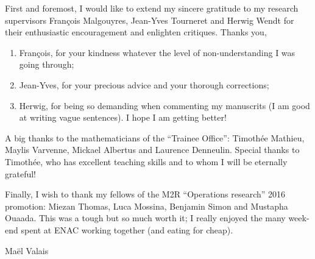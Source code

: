 \begin{foreword}[Acknowledgements]
First and foremost, I would like to extend my sincere gratitude to my research supervisors François Malgouyres, Jean-Yves Tourneret and Herwig Wendt for their enthusiastic encouragement and enlighten critiques. Thanks you,
\begin{enumerate}[label=--,noitemsep,nolistsep]
	\item François, for your kindness whatever the level of non-understanding I was going through;
	\item Jean-Yves, for your precious advice and your thorough corrections;
	\item Herwig, for being so demanding when commenting my manuscrits (I am good at writing vague sentences). I hope I am getting better!
\end{enumerate}

A big thanks to the mathematicians of the “Trainee Office”: Timothée Mathieu, Maylis Varvenne, Mickael Albertus and Laurence Denneulin. Special thanks to Timothée, who has excellent teaching skills and to whom I will be eternally grateful!

Finally, I wish to thank my fellows of the M2R “Operations research” 2016 promotion: Miezan Thomas, Luca Mossina, Benjamin Simon and Mustapha Ouaada. This was a tough but so much worth it; I really enjoyed the many week-end spent at ENAC working together (and eating for cheap).


\begin{flushright}Maël Valais\end{flushright}


\end{foreword}


